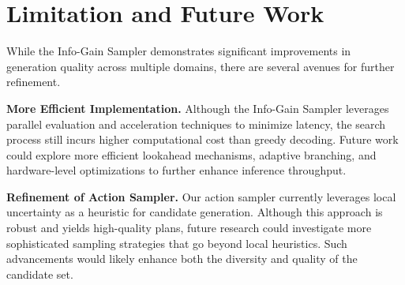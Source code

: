 \vspace{-3mm}
\section{Limitation and Future Work}
\vspace{-1mm}
While the Info-Gain Sampler demonstrates significant improvements in generation quality across multiple domains, there are several avenues for further refinement.

\noindent\textbf{More Efficient Implementation.} Although the Info-Gain Sampler leverages parallel evaluation and acceleration techniques to minimize latency, the search process still incurs higher computational cost than greedy decoding. Future work could explore more efficient lookahead mechanisms, adaptive branching, and hardware-level optimizations to further enhance inference throughput.

\noindent\textbf{Refinement of Action Sampler.} Our action sampler currently leverages local uncertainty as a heuristic for candidate generation. Although this approach is robust and yields high-quality plans, future research could investigate more sophisticated sampling strategies that go beyond local heuristics. Such advancements would likely enhance both the diversity and quality of the candidate set.

